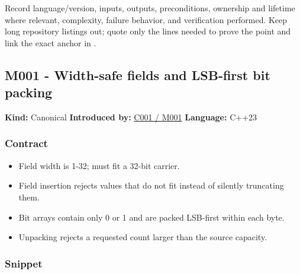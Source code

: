 Record language/version, inputs, outputs, preconditions, ownership and lifetime where relevant, complexity, failure behavior, and verification performed. Keep long repository listings out; quote only the lines needed to prove the point and link the exact anchor in .

\subsection{M001 - Width-safe fields and LSB-first bit packing}\label{appendix-4e2236f53445-m001---width-safe-fields-and-lsb-first-bit-packing}

\hypertarget{appendix-4e2236f53445-m001---width-safe-fields-and-lsb-first-bit-packing}{}

\textbf{Kind:} Canonical \textbf{Introduced by:} \hyperref[01-foundations-i-ch001-from-a-signal-to-an-interpretation]{C001 / M001} \textbf{Language:} C++23

\subsubsection{Contract}\label{appendix-4e2236f53445-contract}

\hypertarget{appendix-4e2236f53445-contract}{}

\begin{itemize}
\tightlist
\item
  Field width is 1-32;  must fit a 32-bit carrier.
\item
  Field insertion rejects values that do not fit instead of silently truncating them.
\item
  Bit arrays contain only 0 or 1 and are packed LSB-first within each byte.
\item
  Unpacking rejects a requested count larger than the source capacity.
\end{itemize}

\subsubsection{Snippet}\label{appendix-4e2236f53445-snippet}

\hypertarget{appendix-4e2236f53445-snippet}{}

